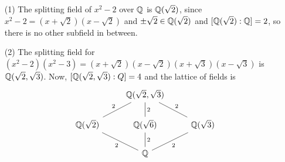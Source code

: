 \begin{example}\label{example_1.11}
    \begin{enumerate}
        \item[(1)] The splitting field of $x^2-2$ over  $\mathbb{Q}$ is  $\mathbb{Q}(\sqrt{2})$,
            since $x^2-2=(x+\sqrt{2})(x-\sqrt{2})$ and $\pm{\sqrt{2}} \in
            \mathbb{Q}(\sqrt{2})$ and $[\mathbb{Q}(\sqrt{2}):\mathbb{Q}]=2$, so there is no other
            subfield in between.

        \item[(2)] The splitting field for
            $(x^2-2)(x^2-3)=(x+\sqrt{2})(x-\sqrt{2})(x+\sqrt{3})(x-\sqrt{3})$ is
            $\mathbb{Q}(\sqrt{2},\sqrt{3})$. Now, $[\mathbb{Q}(\sqrt{2},\sqrt{3}):Q]=4$ and the
            lattice of fields is
            \[\begin{tikzcd}
                & {\Q(\sqrt{2},\sqrt{3})} \\
                {\Q(\sqrt{2})} & {\Q(\sqrt{6})} & {\Q(\sqrt{3})} \\
                & {\mathbb{Q}}
                \arrow["2", no head, from=1-2, to=2-2]
                \arrow["2", no head, from=2-2, to=3-2]
                \arrow["2"', no head, from=3-2, to=2-3]
                \arrow["2"', no head, from=2-3, to=1-2]
                \arrow["2"', no head, from=1-2, to=2-1]
                \arrow["2"', no head, from=2-1, to=3-2]
             \end{tikzcd}\]


\end{enumerate}
\end{example}
